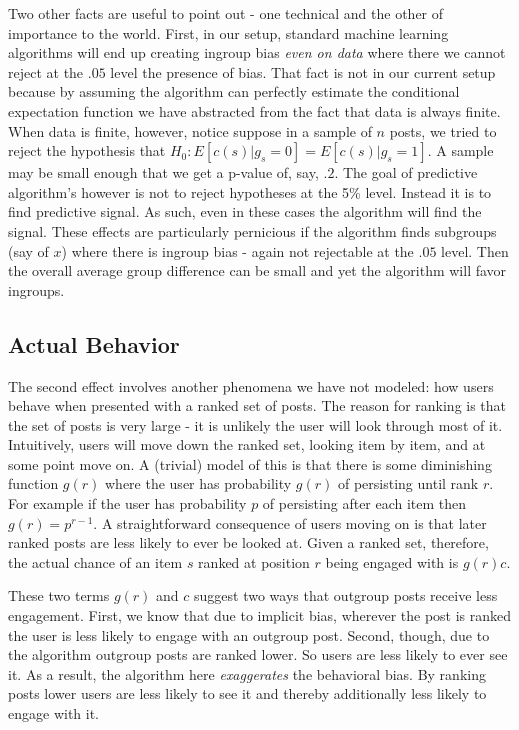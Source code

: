 \documentclass[12pt,letterpaper]{article}
\begin{document}
Two other facts are useful to point out - one technical and the other of importance to the world. First, in our setup, standard machine learning algorithms will end up creating ingroup bias \textit{even on data} where there we cannot reject at the $.05$ level the presence of bias. That fact is not in our current setup because by assuming the algorithm can perfectly estimate the conditional expectation function we have abstracted from the fact that data is always finite. When data is finite, however, notice suppose in a sample of $n$ posts, we tried to reject the hypothesis that $H_0: E[c(s)|g_s=0]=E[c(s)|g_s=1]$. A sample may be small enough that we get a p-value of, say, $.2$. The goal of predictive algorithm's however is not to reject hypotheses at the 5\% level. Instead it is to find predictive signal. As such, even in these cases the algorithm will find the signal.  These effects are particularly pernicious if the algorithm finds subgroups (say of $x$) where there is ingroup bias - again not rejectable at the $.05$ level. Then the overall average group difference can be small and yet the algorithm will favor ingroups. 

\subsection{Actual Behavior} 

The second effect involves another phenomena we have not modeled: how users behave when presented with a ranked set of posts.  The reason for ranking is that the set of posts is very large - it is unlikely the user will look through most of it. Intuitively, users will move down the ranked set, looking item by item, and at some point move on.  A (trivial) model of this is that there is some diminishing function $g(r)$ where the user has probability $g(r)$ of persisting until rank $r$. For example if the user has probability $p$ of persisting after each item then $g(r) = p^{r-1}$. A straightforward consequence of users moving on is that later ranked posts are less likely to ever be looked at.  Given a ranked set, therefore, the actual chance of an item $s$ ranked at position $r$ being engaged with is $g(r)c$.  

These two terms $g(r)$ and $c$ suggest two ways that outgroup posts receive less engagement. First, we know that due to implicit bias, wherever the post is ranked the user is less likely to engage with an outgroup post.  Second, though, due to the algorithm outgroup posts are ranked lower. So users are less likely to ever see it. As a result, the algorithm here \textit{exaggerates} the behavioral bias. By ranking posts lower users are less likely to see it and thereby additionally less likely to engage with it. 
\end{document}
